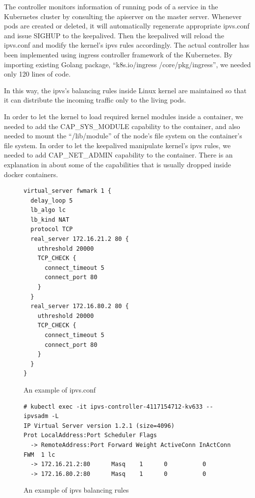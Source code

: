 The controller monitors information of running pods of a service in the Kubernetes cluster by consulting the apiserver on the master server.
Whenever pods are created or deleted, it will automatically regenerate appropriate ipvs.conf and issue SIGHUP to the keepalived.
Then the keepalived will reload the ipvs.conf and modify the kernel's ipvs rules accordingly.  
The actual controller\cite{ktaka_ccmp_2017_826894} has been implemented using ingress controller\cite{K8sIngress2017} framework of the Kubernetes.
By importing existing Golang package, \enquote{k8s.io/ingress /core/pkg/ingress},
we needed only 120 lines of code.  

In this way, the ipvs's balancing rules inside Linux kernel are maintained so that it can distribute the incoming traffic only to the living pods.

In order to let the kernel to load required kernel modules inside a container, 
we needed to add the CAP\_SYS\_MODULE capability to the container, 
and also needed to mount the \enquote{/lib/module} of the node's file system on the container's file system.   
In order to let the keepalived manipulate kernel's ipvs rules, 
we needed to add CAP\_NET\_ADMIN capability to the container.
There is an explanation in \cite{mp2016enhancing} about some of the capabilities 
that is usually dropped inside docker containers.

\begin{figure}
\begin{minipage}{0.7\columnwidth}
\begin{verbatim}
virtual_server fwmark 1 {
  delay_loop 5
  lb_algo lc
  lb_kind NAT
  protocol TCP
  real_server 172.16.21.2 80 {
    uthreshold 20000
    TCP_CHECK {
      connect_timeout 5
      connect_port 80
    }
  }
  real_server 172.16.80.2 80 {
    uthreshold 20000
    TCP_CHECK {
      connect_timeout 5
      connect_port 80
    }
  }
}
\end{verbatim}
\end{minipage}
\caption{An example of ipvs.conf}
\label{fig:ipvs.conf}
\end{figure}

\begin{figure}
\begin{minipage}{\columnwidth}
\small
\begin{verbatim}
# kubectl exec -it ipvs-controller-4117154712-kv633 -- ipvsadm -L
IP Virtual Server version 1.2.1 (size=4096)
Prot LocalAddress:Port Scheduler Flags
  -> RemoteAddress:Port Forward Weight ActiveConn InActConn
FWM  1 lc
  -> 172.16.21.2:80      Masq    1      0          0         
  -> 172.16.80.2:80      Masq    1      0          0
\end{verbatim}
\end{minipage}
\caption{An example of ipvs balancing rules}
\label{fig:ipvs rule}
\end{figure}

